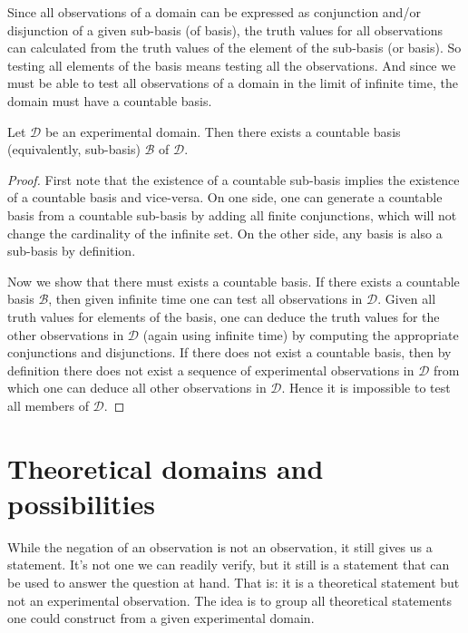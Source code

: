 \documentclass[11pt,letterpaper,fleqn]{memoir} %
\begin{document}
Since all observations of a domain can be expressed as conjunction and/or disjunction of a given sub-basis (of basis), the truth values for all observations can calculated from the truth values of the element of the sub-basis (or basis). So testing all elements of the basis means testing all the observations. And since we must be able to test all observations of a domain in the limit of infinite time, the domain must have a countable basis.

\begin{mathSection}

\begin{prop}
Let $\mathcal{D}$ be an experimental domain. Then there exists a countable basis (equivalently, sub-basis) $\mathcal{B}$ of $\mathcal{D}$.
\end{prop}

\begin{proof}
	First note that the existence of a countable sub-basis implies the existence of a countable basis and vice-versa. On one side, one can generate a countable basis from a countable sub-basis by adding all finite conjunctions, which will not change the cardinality of the infinite set. On the other side, any basis is also a sub-basis by definition.
	
	Now we show that there must exists a countable basis. If there exists a countable basis $\mathcal{B}$, then given infinite time one can test all observations in $\mathcal{D}$. Given all truth values for elements of the basis, one can deduce the truth values for the other observations in $\mathcal{D}$ (again using infinite time) by computing the appropriate conjunctions and disjunctions. If there does not exist a countable basis, then by definition there does not exist a sequence of experimental observations in $\mathcal{D}$ from which one can deduce all other observations in $\mathcal{D}$. Hence it is impossible to test all members of $\mathcal{D}$.
\end{proof}

\end{mathSection}

\section{Theoretical domains and possibilities}


While the negation of an observation is not an observation, it still gives us a statement. It's not one we can readily verify, but it still is a statement that can be used to answer the question at hand. That is: it is a theoretical statement but not an experimental observation. The idea is to group all theoretical statements one could construct from a given experimental domain.
\end{document}
